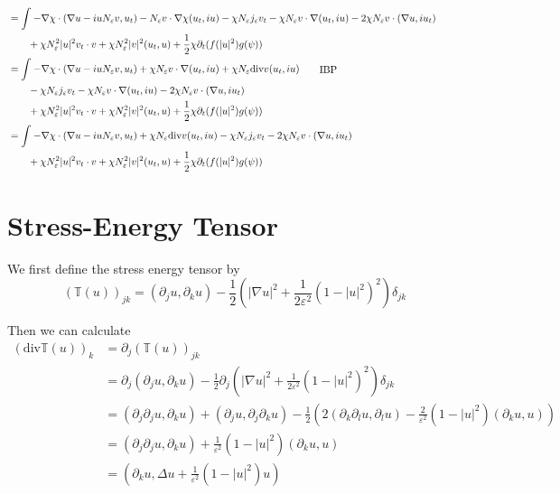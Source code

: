 \documentclass[a4paper]{article}
\renewcommand{\div}{\mathrm{div}}
\begin{document}
\begin{align}
  &= \int_{}^{} - \nabla \chi \cdot ( \nabla u - iuN_\varepsilon v, u_t) - N_\varepsilon v \cdot \nabla \chi (u_t, iu) - \chi N_\varepsilon
  j_\varepsilon v_t - \chi N_\varepsilon v \cdot \nabla (u_t, iu) - 2 \chi
  N_\varepsilon v \cdot (\nabla u, iu_t) \nonumber \\
  &\quad \quad + \chi N_\varepsilon^2 |u|^2 v_t \cdot v + \chi N_\varepsilon^2 |v|^2 (u_t, u) + \frac{1}{2} \chi \partial_t (f(|u|^2) g(\psi)) \nonumber \\
  &= \int_{}^{} - \nabla \chi \cdot (\nabla u - iu N_\varepsilon v, u_t) + \chi N_\varepsilon v \cdot \nabla (u_t, iu) + \chi N_\varepsilon \div v
  (u_t, iu) \quad \quad \parbox{5cm}{IBP} \nonumber \\
  &\quad \quad - \chi N_\varepsilon j_\varepsilon v_t - \chi N_\varepsilon v \cdot \nabla (u_t, iu) - 2 \chi
  N_\varepsilon v \cdot (\nabla u, iu_t) \nonumber \\
  &\quad \quad + \chi N_\varepsilon^2 |u|^2 v_t \cdot v + \chi N_\varepsilon^2 |v|^2 (u_t, u) + \frac{1}{2} \chi \partial_t (f(|u|^2) g(\psi)) \nonumber \\
  &= \int_{}^{} - \nabla \chi \cdot (\nabla u - iu N_\varepsilon v, u_t) + \chi N_\varepsilon \div v (u_t, iu) - \chi N_\varepsilon j_\varepsilon v_t - 2 \chi
  N_\varepsilon v \cdot (\nabla u, iu_t) \nonumber \\
  &\quad \quad + \chi N_\varepsilon^2 |u|^2 v_t \cdot v + \chi N_\varepsilon^2 |v|^2 (u_t, u) + \frac{1}{2} \chi \partial_t (f(|u|^2) g(\psi))
  \label{eqn:mod_energy_deriv}
\end{align}

\section{Stress-Energy Tensor}
We first define the stress energy tensor by
\begin{equation}
  (\mathbb{T}(u))_{jk} = (\partial_j u, \partial_k u) - \frac{1}{2} \left( |\nabla u|^2 + \frac{1}{2 \varepsilon^2} (1 - |u|^2)^2 \right) \delta_{jk}
  \label{eqn:stress_energy}
\end{equation}

Then we can calculate
\begin{align}
  (\div \mathbb{T}(u))_k &= \partial_j (\mathbb{T}(u))_{jk} \nonumber \\
  &= \partial_j (\partial_j u, \partial_k u) - \frac{1}{2} \partial_j \left( |\nabla u|^2 + \frac{1}{2 \varepsilon^2} ( 1 - |u|^2)^2 \right)
  \delta_{jk} \nonumber \\
  &= (\partial_j \partial_j u, \partial_k u) + (\partial_j u, \partial_j \partial_k u) - \frac{1}{2} \left( 2( \partial_k \partial_l u, \partial_l u)
  - \frac{2}{\varepsilon^2} (1- |u|^2) (\partial_k u, u) \right) \nonumber \\
  &= (\partial_j \partial_j u, \partial_k u) + \frac{1}{\varepsilon^2} (1-|u|^2) (\partial_k u, u) \nonumber \\
  &= ( \partial_k u, \Delta u + \frac{1}{\varepsilon^2} (1 - |u|^2)u)
  \label{eqn:div_stress_energy_comp}
\end{align}
\end{document}
